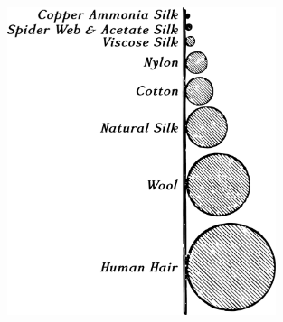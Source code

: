 \begin{figure}[h!]
\centering
\includegraphics[width=0.7\textwidth]{figures/ch-11/fig-163a.pdf}
\end{figure}



